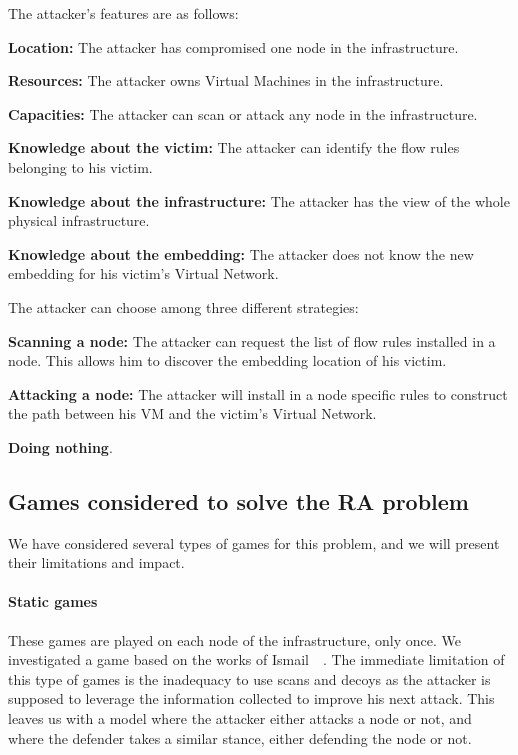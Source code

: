 The attacker's features are as follows:
\begin{description}
\item \textbf{Location: } The attacker has compromised one node in the infrastructure.
\item \textbf{Resources: } The attacker owns Virtual Machines in the infrastructure.
\item \textbf{Capacities: } The attacker can scan or attack any node in the infrastructure.
\item \textbf{Knowledge about the victim: } The attacker can identify the flow rules belonging to his victim.
\item \textbf{Knowledge about the infrastructure: } The attacker has the view of the whole physical infrastructure.
\item \textbf{Knowledge about the embedding: } The attacker does not know the new embedding for his victim's Virtual Network.
\end{description}

The attacker can choose among three different strategies:
\begin{description}
\item \textbf{Scanning a node: } The attacker can request the list of  flow rules installed in a node. This allows him to discover the embedding location of his victim.
\item \textbf{Attacking a node: } The attacker will install in a node specific rules to construct the path between his VM and the victim's Virtual Network.
\item \textbf{Doing nothing}.
\end{description}



\subsection{Games considered to solve the RA problem}
We have considered several types of games for this problem, and we will present their limitations and impact.

\paragraph{Static games} These games are played on each node of the infrastructure, only once. We investigated a game based on the works of Ismail~\etal~\cite{Chen2009,interdep-ismail2017}. The immediate limitation of this type of games is the inadequacy to use scans and decoys as the attacker is supposed to leverage the information collected to improve his next attack. This leaves us with a model where the attacker either attacks a node or not, and where the defender takes a similar stance, either defending the node or not.

